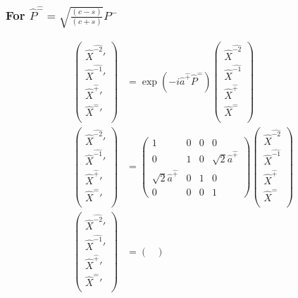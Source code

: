 \documentclass[]{article}
\numberwithin{equation}{section}
\begin{document}
{{\subsubsection{For $\hat{P}^{\hat{-}}=\sqrt{\frac{(c-s)}{(c+s)}}P^{{-}}$}
\begin{align}
\begin{pmatrix}
    \hat{X}^{\hat{-2}}'\\
    \hat{X}^{\hat{-1}}'\\
    \hat{X}^{\hat{+}}'\\
    \hat{X}^{\hat{-}}'\\
    \end{pmatrix}&= \exp{(-i\hat{a}^{\hat{+}}\hat{P}^{\hat{-}})}\begin{pmatrix}
    \hat{X}^{\hat{-2}}\\
    \hat{X}^{\hat{-1}}\\
    \hat{X}^{\hat{+}}\\
    \hat{X}^{\hat{-}}\\
    \end{pmatrix}\\
    \begin{pmatrix}
    \hat{X}^{\hat{-2}}'\\
    \hat{X}^{\hat{-1}}'\\
    \hat{X}^{\hat{+}}'\\
    \hat{X}^{\hat{-}}'\\
    \end{pmatrix}&= \begin{pmatrix}
        1&0&0&0\\
        0&1&0&\sqrt{2}\hat{a}^{\hat{+}}\\
        \sqrt{2}\hat{a}^{\hat{+}}&0&1&0\\
        0&0&0&1
    \end{pmatrix}\begin{pmatrix}
    \hat{X}^{\hat{-2}}\\
    \hat{X}^{\hat{-1}}\\
    \hat{X}^{\hat{+}}\\
    \hat{X}^{\hat{-}}\\
    \end{pmatrix}\\
    \begin{pmatrix}
    \hat{X}^{\hat{-2}}'\\
    \hat{X}^{\hat{-1}}'\\
    \hat{X}^{\hat{+}}'\\
    \hat{X}^{\hat{-}}'\\
    \end{pmatrix}&= \begin{pmatrix}

\end{pmatrix}
\end{align}}}
\end{document}
